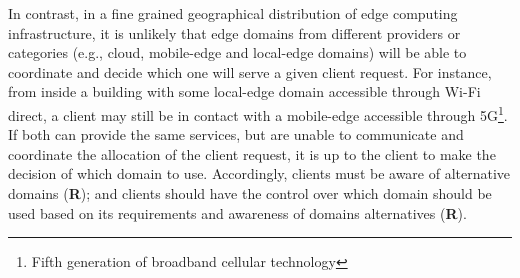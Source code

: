 In contrast, in a fine grained geographical distribution of edge computing infrastructure, it is unlikely that edge domains from different providers or categories (e.g., cloud, mobile-edge and local-edge domains) will be able to coordinate and decide which one will serve a given client request. For instance, from inside a building with some local-edge domain accessible through Wi-Fi direct, a client may still be in contact with a mobile-edge accessible through 5G\footnote{Fifth generation of broadband cellular technology}. If both can provide the same services, but are unable to communicate and coordinate the allocation of the client request, it is up to the client to make the decision of which domain to use. Accordingly, clients must be aware of alternative domains (\textbf{R}); and clients should have the control over which domain should be used based on its requirements and awareness of domains alternatives (\textbf{R}).



%
%
%



